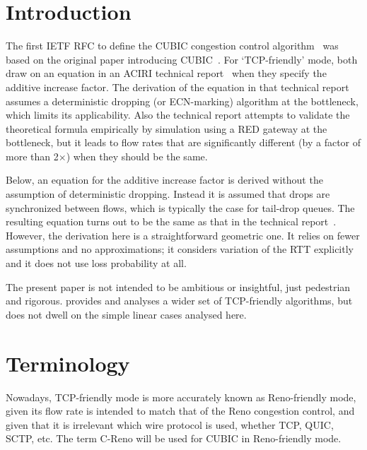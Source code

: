 \section{Introduction}\label{Introduction}

The first IETF RFC to define the CUBIC congestion control algorithm~\cite{Rhee18:Cubic_RFC} was based on the original paper introducing CUBIC~\cite{Ha08:cubic}. For `TCP-friendly' mode, both draw on an equation in an ACIRI technical report~\cite{Floyd00:Eqn_v_AIMD_cc} when they specify the additive increase factor. The derivation of the equation in that technical report assumes a deterministic dropping (or ECN-marking) algorithm at the bottleneck, which limits its applicability. Also the technical report attempts to validate the theoretical formula empirically by simulation using a RED gateway at the bottleneck, but it leads to flow rates that are significantly different (by a factor of more than 2\(\times\)) when they should be the same.

Below, an equation for the additive increase factor is derived without the assumption of deterministic dropping. Instead it is assumed that drops are synchronized between flows, which is typically the case for tail-drop queues. The resulting equation turns out to be the same as that in the technical report~\cite{Floyd00:Eqn_v_AIMD_cc}. However, the derivation here is a straightforward geometric one. It relies on fewer assumptions and no approximations; it considers variation of the RTT explicitly and it does not use loss probability at all.

The present paper is not intended to be ambitious or insightful, just pedestrian and rigorous. \cite{Bansal01:Binom_cc} provides and analyses a wider set of TCP-friendly algorithms, but does not dwell on the simple linear cases analysed here.

\section{Terminology}\label{Terminology}

Nowadays, TCP-friendly mode is more accurately known as Reno-friendly mode, given its flow rate is intended to match that of the Reno congestion control, and given that it is irrelevant which wire protocol is used, whether TCP, QUIC, SCTP, etc. The term C-Reno will be used for CUBIC in Reno-friendly mode.


